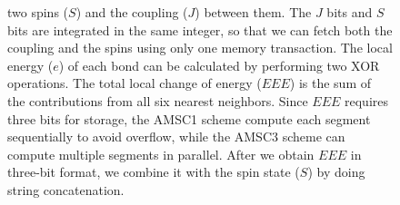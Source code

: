 \begin{figure}[ht]
{  two spins ($S$) and the coupling ($J$) between them. The $J$ bits
  and $S$ bits are integrated in the same integer, so that we can
  fetch both the coupling and the spins using only one memory
  transaction. The local energy ($e$) of each bond 
  can be calculated by performing two XOR operations. The
  total local change of energy ($EEE$) is the sum of the contributions
  from all six nearest neighbors. Since $EEE$ requires three bits for
  storage, the AMSC1 scheme compute each segment sequentially to
  avoid overflow, while the AMSC3 scheme can compute multiple segments in
  parallel.  After we obtain $EEE$ in three-bit format, we combine it
  with the spin state ($S$) by doing string concatenation.}
\label{fig_msc1}
\end{figure}


\begin{figure}
\centering
 \hspace{0.5cm}

\end{figure}
